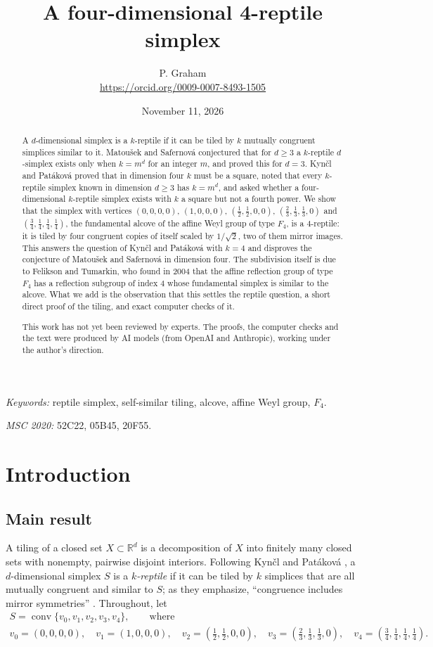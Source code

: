 \documentclass[11pt]{article}
\title{A four-dimensional 4-reptile simplex}
\author{P. Graham\\ \small\url{https://orcid.org/0009-0007-8493-1505}}
\date{November 11, 2026}
\theoremstyle{remark}
\begin{document}
\maketitle
\begin{abstract}
A $d$-dimensional simplex is a $k$-reptile if it can be tiled by $k$
mutually congruent simplices similar to it. Matoušek and Safernová
conjectured that for $d\ge3$ a $k$-reptile $d$-simplex exists only when
$k=m^d$ for an integer $m$, and proved this for $d=3$. Kynčl and Patáková
proved that in dimension four $k$ must be a square, noted that every
$k$-reptile simplex known in dimension $d\ge3$ has $k=m^d$, and asked
whether a four-dimensional $k$-reptile simplex exists with $k$ a square
but not a fourth power. We show that the simplex with vertices $(0,0,0,0)$, $(1,0,0,0)$,
$(\tfrac12,\tfrac12,0,0)$, $(\tfrac23,\tfrac13,\tfrac13,0)$ and
$(\tfrac34,\tfrac14,\tfrac14,\tfrac14)$, the fundamental alcove of the
affine Weyl group of type $F_4$, is a $4$-reptile: it is tiled by four
congruent copies of itself scaled by $1/\sqrt2$, two of them mirror
images. This answers the question of Kynčl and Patáková with $k=4$ and
disproves the conjecture of Matoušek and Safernová in dimension four. The
subdivision itself is due to Felikson and Tumarkin, who found in 2004 that
the affine reflection group of type $F_4$ has a reflection subgroup of
index $4$ whose fundamental simplex is similar to the alcove. What we add
is the observation that this settles the reptile question, a short direct
proof of the tiling, and exact computer checks of it.

This work has not yet been reviewed by experts.
The proofs, the computer checks and the text were produced by AI models
(from OpenAI and Anthropic), working under the author's direction.
\end{abstract}
\medskip
\noindent\textit{Keywords:} reptile simplex, self-similar tiling,
alcove, affine Weyl group, $F_4$.

\noindent\textit{MSC 2020:} 52C22, 05B45, 20F55.

\section{Introduction}

\subsection{Main result}
A tiling of a closed set $X\subset\mathbb{R}^d$ is a decomposition of $X$
into finitely many closed sets with nonempty, pairwise disjoint
interiors. Following Kynčl and Patáková \cite{KP}, a $d$-dimensional
simplex $S$ is a \emph{$k$-reptile} if it can be tiled by $k$ simplices
that are all mutually congruent and similar to $S$; as they emphasize,
``congruence includes mirror symmetries'' \cite[p.~1]{KP}. Throughout, let
\begin{gather*}
S=\operatorname{conv}\{v_0,v_1,v_2,v_3,v_4\},\qquad\text{where}\\
v_0=(0,0,0,0),\quad v_1=(1,0,0,0),\quad v_2=(\tfrac12,\tfrac12,0,0),\quad
v_3=(\tfrac23,\tfrac13,\tfrac13,0),\quad v_4=(\tfrac34,\tfrac14,\tfrac14,\tfrac14).
\end{gather*}
\end{document}
